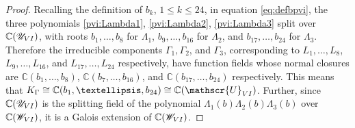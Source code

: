 \documentclass[10pt,a4paper]{amsart}
\newcommand{\C}{\mathbb{C}}
\begin{document}
\begin{proof}
Recalling the definition of $b_k$, $1\leq k\leq 24$, in equation \eqref{eq:defbpvi}, the three polynomials \eqref{pvi:Lambda1}, \eqref{pvi:Lambda2}, \eqref{pvi:Lambda3} split over $\C(\mathscr{U}_{\rm{VI}})$, with roots $b_1,\dots,b_8$ for $\Lambda_1$,  $b_9,\dots,b_{16}$ for $\Lambda_2$, and $b_{17},\dots,b_{24}$ for $\Lambda_3$.
Therefore the irreducible components $\Gamma_1,\Gamma_2$, and $\Gamma_3$, corresponding to $L_1,\dots,L_8$, $L_9,\dots,L_{16}$, and  $L_{17},\dots,L_{24}$ respectively, have function fields whose normal closures are $\C(b_1,\dots,b_8)$, $\C(b_7,\dots,b_{16})$, and 
$\C(b_{17},\dots,b_{24})$ respectively.
This means that $K_{\Gamma}\cong\mathbb{C}(b_1,\dots, b_{24}) \cong \C(\mathscr{U}_{\rm{VI}})$.
    Further, since $\C(\mathscr{U}_{\rm{VI}
    })$ is the splitting field of the polynomial $\Lambda_1(b)\Lambda_2(b)\Lambda_3(b)$ over $\mathbb{C}(\mathscr{W}_{\rm{VI}})$, it is a Galois extension of $\mathbb{C}(\mathscr{W}_{\rm{VI}})$.

\begingroup

\setlength{\tabcolsep}{15pt} %
\renewcommand{\arraystretch}{1.75} %


\end{proof}
\end{document}
